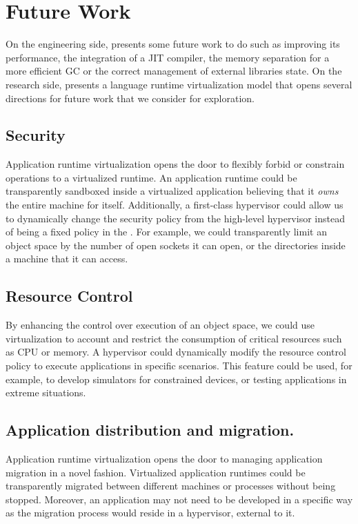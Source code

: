 \section{Future Work}

On the engineering side, \Vtt presents some future work to do such as improving its performance, the integration of a JIT compiler, the memory separation for a more efficient GC or the correct management of external libraries state. On the research side, \Vtt presents a language runtime virtualization model that opens several directions for future work that we consider for exploration.

\subsection{Security} Application runtime virtualization opens the door to flexibly forbid or constrain operations to a virtualized runtime. An application runtime could be transparently sandboxed inside a virtualized application believing that it \emph{owns} the entire machine for itself. Additionally, a first-class hypervisor could allow us to dynamically change the security policy from the high-level hypervisor instead of being a fixed policy in the \VM. For example, we could transparently limit an object space by the number of open sockets it can open, or the directories inside a machine that it can access.

\subsection{Resource Control} By enhancing the control over execution of an object space, we could use virtualization to account and restrict the consumption of critical resources such as CPU or memory. A hypervisor could dynamically modify the resource control policy to execute applications in specific scenarios. This feature could be used, for example, to develop simulators for constrained devices, or testing applications in extreme situations.

\subsection{Application distribution and migration.} Application runtime virtualization opens the door to managing application migration in a novel fashion. Virtualized application runtimes could be transparently migrated between different machines or processes without being stopped. Moreover, an application may not need to be developed in a specific way as the migration process would reside in a hypervisor, external to it.

